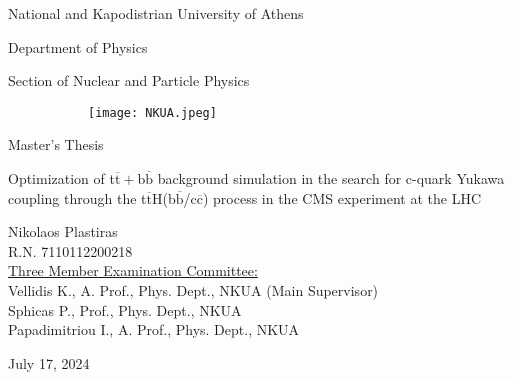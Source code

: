 \newpage%
\clearpage%
\begin{titlepage}%
    \begin{center}%

        \vspace*{0.5cm}%
        
        {\Large National and Kapodistrian University of Athens \par}%
        {\Large Department of Physics \par}%
        {\Large Section of Nuclear and Particle Physics \par}%

               
 	\begin{figure}[H]%
	        \centering%
            \begin{subfigure}[b]{0.7\textwidth}%
                    \centering
  	            \texttt{[image: NKUA.jpeg]}%
            \end{subfigure}%
        \end{figure}%

        
	\vspace*{0.5cm}%

        {\Large Master's Thesis }%
                \\\vspace{1em}%
 	{\Large Optimization of t$\overline{\text{t}}+$b$\overline{\text{b}}$ background simulation in the search for c-quark Yukawa coupling through the t$\overline{\text{t}}$H(b$\overline{\text{b}}$/c$\overline{\text{c}}$) process in the CMS experiment at the LHC \par}%
			
	\vspace{1.0cm}%
	{\Large Nikolaos Plastiras}%
        \\\vspace{1em}%
        {\Large R.N. 7110112200218}
        \\\vspace{2em}%
        {\large \underline{Three Member Examination Committee:}}%
        \\
        {\large Vellidis K., A. Prof., Phys. Dept., NKUA (Main Supervisor)}%
        \\
        {\large Sphicas P., Prof., Phys. Dept., NKUA}%
        \\
        {\large Papadimitriou I., A. Prof., Phys. Dept., NKUA}%
		
		\vfill%
            July 17, 2024
  
	\end{center}%
\end{titlepage}%